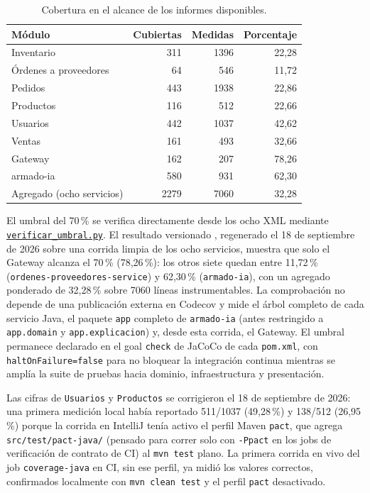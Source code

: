 \documentclass[12pt,a4paper]{article}
\newcommand{\evidencia}[2]{\href{https://github.com/JoseLozanoMorales/TiendaTech/blob/c5dca588ea9662cab56732c97fe644b9a929854b/#1}{#2}}
\begin{document}
\begin{table}[H]\centering\small
\caption{Cobertura en el alcance de los informes disponibles.}\label{tab:cobertura}
\begin{tabular}{lrrr}
\toprule Módulo & Cubiertas & Medidas & Porcentaje\\\midrule
Inventario & 311 & 1396 & 22,28\\
Órdenes a proveedores & 64 & 546 & 11,72\\
Pedidos & 443 & 1938 & 22,86\\
Productos & 116 & 512 & 22,66\\
Usuarios & 442 & 1037 & 42,62\\
Ventas & 161 & 493 & 32,66\\
Gateway & 162 & 207 & 78,26\\
armado-ia & 580 & 931 & 62,30\\\midrule
Agregado (ocho servicios) & 2279 & 7060 & 32,28\\\bottomrule
\end{tabular}
\end{table}

El umbral del 70\,\% se verifica directamente desde los ocho XML mediante \evidencia{docs/evidencias/cobertura/verificar_umbral.py}{\texttt{verificar\_umbral.py}}. El resultado versionado , regenerado el 18 de septiembre de 2026 sobre una corrida limpia de los ocho servicios, muestra que solo el Gateway alcanza el 70\,\% (78,26\,\%): los otros siete quedan entre 11,72\,\% (\texttt{ordenes-proveedores-service}) y 62,30\,\% (\texttt{armado-ia}), con un agregado ponderado de 32,28\,\% sobre 7060 líneas instrumentables. La comprobación no depende de una publicación externa en Codecov y mide el árbol completo de cada servicio Java, el paquete \texttt{app} completo de \texttt{armado-ia} (antes restringido a \texttt{app.domain} y \texttt{app.explicacion}) y, desde esta corrida, el Gateway. El umbral permanece declarado en el goal \texttt{check} de JaCoCo de cada \texttt{pom.xml}, con \texttt{haltOnFailure=false} para no bloquear la integración continua mientras se amplía la suite de pruebas hacia dominio, infraestructura y presentación.

Las cifras de \texttt{Usuarios} y \texttt{Productos} se corrigieron el 18 de septiembre de 2026: una primera medición local había reportado 511/1037 (49,28\,\%) y 138/512 (26,95\,\%) porque la corrida en IntelliJ tenía activo el perfil Maven \texttt{pact}, que agrega \texttt{src/test/pact-java/} (pensado para correr solo con \texttt{-Ppact} en los jobs de verificación de contrato de CI) al \texttt{mvn test} plano. La primera corrida en vivo del job \texttt{coverage-java} en CI, sin ese perfil, ya midió los valores correctos, confirmados localmente con \texttt{mvn clean test} y el perfil \texttt{pact} desactivado.
\end{document}
